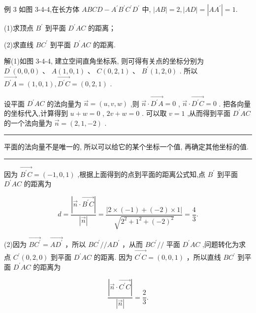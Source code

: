 \documentclass[10pt]{article}
\newcommand{\HRule}{\begin{center}\rule{0.9\linewidth}{0.2mm}\end{center}}
\begin{document}
例 3 如图 3-4-4,在长方体 \({ABCD} - {A}^{\prime }{B}^{\prime }{C}^{\prime }{D}^{\prime }\) 中, \(\left| {AB}\right|  = 2,\left| {AD}\right|  = \left| {A{A}^{\prime }}\right|  = 1.\)

(1)求顶点 \({B}^{\prime }\) 到平面 \({D}^{\prime }{AC}\) 的距离；

(2)求直线 \(B{C}^{\prime }\) 到平面 \({D}^{\prime }{AC}\) 的距离.

解(1)如图 3-4-4, 建立空间直角坐标系, 则可得有关点的坐标分别为 \({D}^{\prime }\left( {0,0,0}\right) \text{ 、 }A\left( {1,0,1}\right) \text{ 、 }C\left( {0,2,1}\right)\) 、 \({B}^{\prime }\left( {1,2,0}\right)\) . 所以 \(\overrightarrow{{D}^{\prime }A} = \left( {1,0,1}\right) ,\overrightarrow{{D}^{\prime }C} = \left( {0,2,1}\right)\) .

设平面 \({D}^{\prime }{AC}\) 的法向量为 \(\overrightarrow{n} = \left( {u,v,w}\right)\) ,则 \(\overrightarrow{n} \cdot  \overrightarrow{{D}^{\prime }A} = 0\) , \(\overrightarrow{n} \cdot  \overrightarrow{{D}^{\prime }C} = 0\) . 把各向量的坐标代入,计算得到 \(u + w = 0\) , \({2v} + w = 0\) . 可以取 \(v = 1\) ,从而得到平面 \({D}^{\prime }{AC}\) 的一个法向量为 \(\overrightarrow{n} = \left( {2,1, - 2}\right)\) .

\HRule

平面的法向量不是唯一的, 所以可以给它的某个坐标一个值, 再确定其他坐标的值.

\HRule

因为 \(\overrightarrow{{B}^{\prime }C} = \left( {-1,0,1}\right)\) ,根据上面得到的点到平面的距离公式知,点 \({B}^{\prime }\) 到平面 \({D}^{\prime }{AC}\) 的距离为

\[
d = \frac{\left| \overrightarrow{n} \cdot  \overrightarrow{{B}^{\prime }C}\right| }{\left| \overrightarrow{n}\right| } = \frac{\left| 2 \times  \left( -1\right)  + \left( -2\right)  \times  1\right| }{\sqrt{{2}^{2} + {1}^{2} + {\left( -2\right) }^{2}}} = \frac{4}{3}.
\]

(2)因为 \(\overrightarrow{B{C}^{\prime }} = \overrightarrow{A{D}^{\prime }}\) ，所以 \(B{C}^{\prime }//A{D}^{\prime }\) ，从而 \(B{C}^{\prime }//\) 平面 \({D}^{\prime }{AC}\) ,问题转化为求点 \({C}^{\prime }\left( {0,2,0}\right)\) 到平面 \({D}^{\prime }{AC}\) 的距离. 因为 \(\overrightarrow{{C}^{\prime }C} = \left( {0,0,1}\right)\) ，所以直线 \(B{C}^{\prime }\) 到平面 \({D}^{\prime }{AC}\) 的距离为

\[
\frac{\left| \overrightarrow{n} \cdot  \overrightarrow{{C}^{\prime }C}\right| }{\left| \overrightarrow{n}\right| } = \frac{2}{3}.
\]
\end{document}
